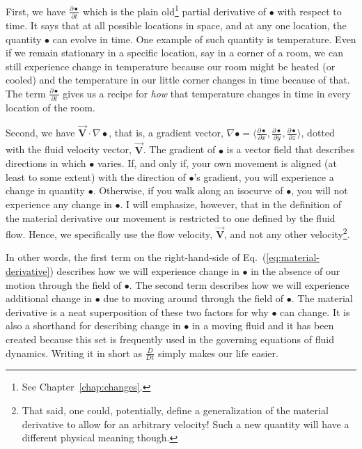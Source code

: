 First, we have $\frac{\partial \bullet}{\partial t}$ which is the plain old\footnote{See Chapter~\ref{chap:changes}.} partial derivative of $\bullet$ with respect to time. It says that at all possible locations in space, and at any one location, the quantity $\bullet$ can evolve in time. One example of such quantity is temperature. Even if we remain stationary in a specific location, say in a corner of a room, we can still experience change in temperature because our room might be heated (or cooled) and the temperature in our little corner changes in time because of that. The term $\frac{\partial \bullet}{\partial t}$ gives us a recipe for \textit{how} that temperature changes in time in every location of the room.

Second, we have $\vec{\bm{V}} \cdot \nabla \bullet$, that is, a gradient vector, $\nabla \bullet = \langle \frac{\partial \bullet}{\partial x}, \frac{\partial \bullet}{\partial y}, \frac{\partial \bullet}{\partial z} \rangle$, dotted with the fluid velocity vector, $\vec{\bm{V}}$. 
The gradient of $\bullet$ is a vector field that describes directions in which $\bullet$ varies. If, and only if, your own movement is aligned (at least to some extent) with the direction of $\bullet$'s gradient, you will experience a change in quantity $\bullet$. Otherwise, if you walk along an isocurve of $\bullet$, you will not experience any change in $\bullet$. I will emphasize, however, that in the definition of the material derivative our movement is restricted to one defined by the fluid flow. Hence, we specifically use the flow velocity, $\vec{\bm{V}}$, and not any other velocity\footnote{That said, one could, potentially, define a generalization of the material derivative to allow for an arbitrary velocity! Such a new quantity will have a different physical meaning though.}.

In other words, the first term on the right-hand-side of Eq.~(\ref{eq:material-derivative}) describes how we will experience change in $\bullet$ in the absence of our motion through the field of $\bullet$. The second term describes how we will experience additional change in $\bullet$ due to moving around through the field of $\bullet$. The material derivative is a neat superposition of these two factors for why $\bullet$ can change. It is also a shorthand for describing change in $\bullet$ in a moving fluid and it has been created because this set is frequently used in the governing equations of fluid dynamics. Writing it in short as $\frac{D}{D t}$ simply makes our life easier.

